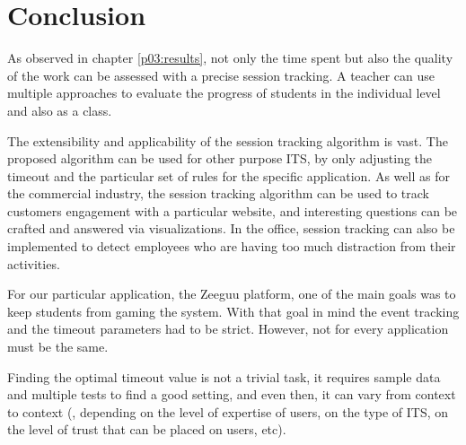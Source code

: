 \chapter{Conclusion}

As observed in chapter \ref{p03:results}, not only the time spent but also the quality of the work can be assessed with a precise session tracking. A teacher can use multiple approaches to evaluate the progress of students in the individual level and also as a class.

The extensibility and applicability of the session tracking algorithm is vast. The proposed algorithm can be used for other purpose ITS, by only adjusting the timeout and the particular set of rules for the specific application. As well as for the commercial industry, the session tracking algorithm can be used to track customers engagement with a particular website, and interesting questions can be crafted and answered via visualizations. In the office, session tracking can also be implemented to detect employees who are having too much distraction from their activities. 

For our particular application, the Zeeguu platform, one of the main goals was to keep students from gaming the system. With that goal in mind the event tracking and the timeout parameters had to be strict. However, not for every application must be the same.

Finding the optimal timeout value is not a trivial task, it requires sample data and multiple tests to find a good setting, and even then, it can vary from context to context (\eg, depending on the level of expertise of users, on the type of ITS, on the level of trust that can be placed on users, etc).

